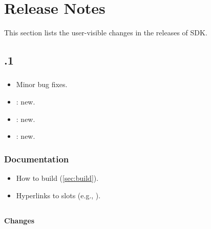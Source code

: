 
\chapter{Release Notes}
\label{sec:news}

This section lists the user-visible changes in the releases of \urbi
SDK.

\section{.1}

\subsection{\us}
\begin{itemize}
\item Minor bug fixes.
\item {}: new.
\item {}: new.
\item {}: new.
\end{itemize}

\subsection{Documentation}

\begin{itemize}
\item How to build \usdk (\autoref{sec:build}).
\item Hyperlinks to slots (e.g., ).
\end{itemize}


\section{}

\subsection{\us}

\subsubsection{Changes}

